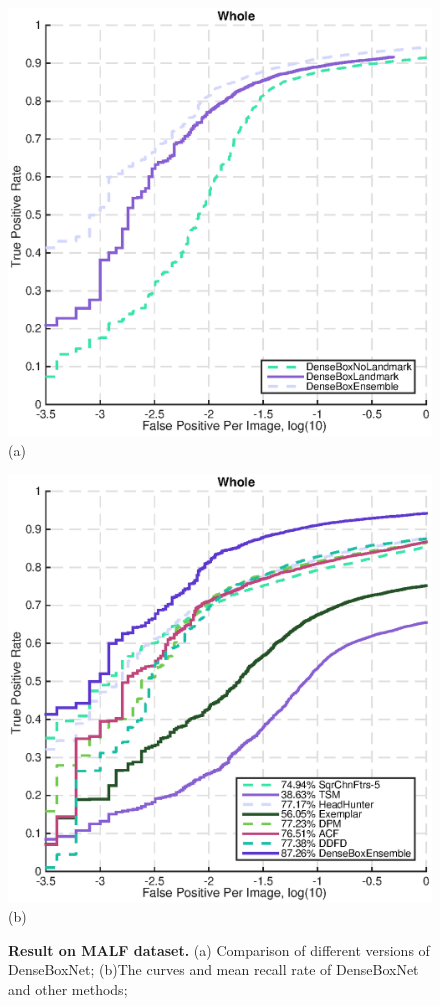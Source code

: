 
\begin{figure} 
  \begin{minipage}[t]{0.5\linewidth} %
    \centering 
    \includegraphics[scale = 0.5]{figures/MALF_1.eps}  (a)
  \end{minipage}%
  \begin{minipage}[t]{0.5\linewidth} 
    \centering 
    \includegraphics[scale = 0.5]{figures/MALF_2.eps}  (b)
  \end{minipage} 
 \caption{  \textbf{Result on MALF dataset. }  (a) Comparison of different versions of DenseBoxNet; (b)The curves and mean recall rate of DenseBoxNet and other methods;  }\label{fig:fig_malf}
\end{figure}

